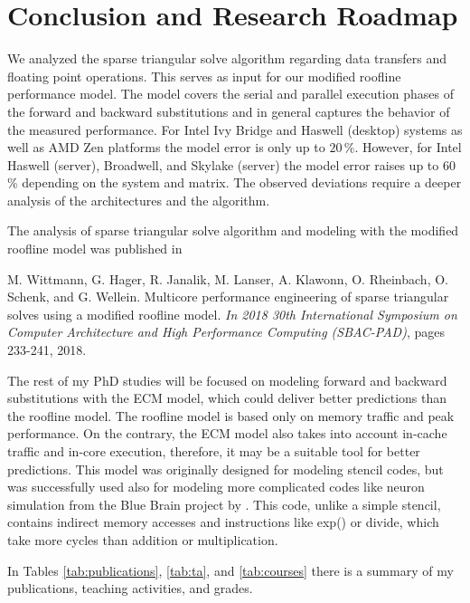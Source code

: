 \chapter{Conclusion and Research Roadmap}
\label{sec:conclusion}

We analyzed the sparse triangular solve algorithm regarding data
transfers and floating point operations.
This serves as input for our modified roofline performance model.
The model covers the serial and parallel execution phases of the forward and
backward substitutions and in general captures the behavior of the measured
performance.
%
For Intel Ivy Bridge and Haswell (desktop) systems as well as AMD Zen platforms
the model error is only up to $20$\,\%.
However, for Intel Haswell (server), Broadwell, and Skylake (server) the model
error raises up to $60$\,\% depending on the system and matrix.
%
The observed deviations require a deeper analysis
of the architectures
and the algorithm.

The analysis of sparse triangular solve algorithm and modeling with the modified roofline model was published in %

\vspace{0.5em}
M. Wittmann, G. Hager, R. Janalik, M. Lanser, A. Klawonn, O. Rheinbach, O. Schenk, and G. Wellein. Multicore performance engineering of sparse triangular solves using a modified roofline model. \textit{In 2018 30th International Symposium on Computer Architecture and High Performance Computing (SBAC-PAD)}, pages 233-241, 2018.
\vspace{0.5em}

The rest of my PhD studies will be focused on modeling forward and backward substitutions with the ECM model, which could deliver better predictions than the roofline model.
The roofline model is based only on memory traffic and peak performance.
On the contrary, the ECM model also takes into account in-cache traffic and in-core execution, therefore, it may be a suitable tool for better predictions. This model was originally designed for modeling stencil codes, but was successfully used also for modeling more complicated codes like neuron simulation from the Blue Brain project by \cite{Cremonesi-2020}. This code, unlike a simple stencil, contains indirect memory accesses and instructions like exp() or divide, which take more cycles than addition or multiplication.

In Tables \ref{tab:publications}, \ref{tab:ta}, and \ref{tab:courses} there is a summary of my publications, teaching activities, and grades.

